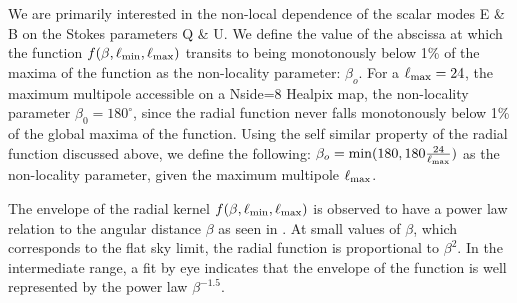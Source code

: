 We are primarily interested in the non-local dependence of the scalar modes E \& B on the Stokes parameters Q \& U. We define the value of the abscissa at which the function $f(\beta,\ell_{\rm min},\ell_{\rm max})$ transits to being monotonously below 1\% of the maxima of the function as the non-locality parameter: $\beta_{o}$.  For a $\ell_{\rm max}=24$, the maximum multipole accessible on a Nside=8 Healpix map, the non-locality parameter $\beta_0=180^{\circ}$, since the radial function never falls monotonously below 1\% of the global maxima of the function. Using the self similar  property of the radial function discussed above, we define the following: $\beta_o= {\rm min}(180,180 \frac{24}{\ell_{\rm max}})$ as the non-locality parameter, given the maximum multipole $\ell_{\rm max}$.  

The envelope of the radial kernel $f(\beta,\ell_{\rm min},\ell_{\rm max})$ is observed to have a power law relation to the angular distance $\beta$ as seen in . At small values of $\beta$, which corresponds to the flat sky limit,  the radial function is proportional to $\beta^2$. In the intermediate range,  a fit by eye indicates that the envelope of the function is well represented by the power law $\beta^{-1.5}$.

